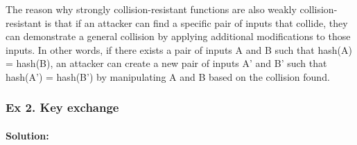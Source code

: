 {\begin{enumerate}
	The reason why strongly collision-resistant functions are also weakly collision-resistant is that if an attacker can find a specific pair of inputs that collide, they can demonstrate a general collision by applying additional modifications to those inputs. In other words, if there exists a pair of inputs A and B such that hash(A) = hash(B), an attacker can create a new pair of inputs A' and B' such that hash(A') = hash(B') by manipulating A and B based on the collision found.
	\end{enumerate}}
	
	\subsubsection{Ex 2. Key exchange}	
	
	\paragraph{Solution:}
		
